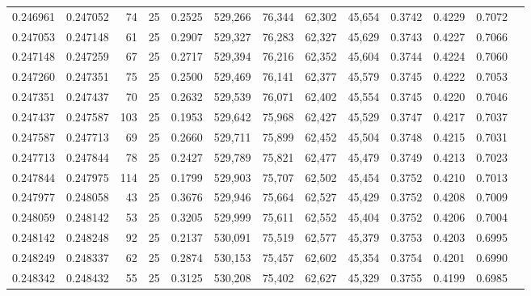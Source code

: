 \begin{tabular}{rrrrrrrrrrrrr}
0.246961 & 0.247052 &    74 &  25 &                                     0.2525 & 529,266 &  76,344 &  62,302 &  45,654 & 0.3742 & 0.4229 & 0.7072 \\
0.247053 & 0.247148 &    61 &  25 &                                     0.2907 & 529,327 &  76,283 &  62,327 &  45,629 & 0.3743 & 0.4227 & 0.7066 \\
0.247148 & 0.247259 &    67 &  25 &                                     0.2717 & 529,394 &  76,216 &  62,352 &  45,604 & 0.3744 & 0.4224 & 0.7060 \\
0.247260 & 0.247351 &    75 &  25 &                                     0.2500 & 529,469 &  76,141 &  62,377 &  45,579 & 0.3745 & 0.4222 & 0.7053 \\
0.247351 & 0.247437 &    70 &  25 &                                     0.2632 & 529,539 &  76,071 &  62,402 &  45,554 & 0.3745 & 0.4220 & 0.7046 \\
0.247437 & 0.247587 &   103 &  25 &                                     0.1953 & 529,642 &  75,968 &  62,427 &  45,529 & 0.3747 & 0.4217 & 0.7037 \\
0.247587 & 0.247713 &    69 &  25 &                                     0.2660 & 529,711 &  75,899 &  62,452 &  45,504 & 0.3748 & 0.4215 & 0.7031 \\
0.247713 & 0.247844 &    78 &  25 &                                     0.2427 & 529,789 &  75,821 &  62,477 &  45,479 & 0.3749 & 0.4213 & 0.7023 \\
0.247844 & 0.247975 &   114 &  25 &                                     0.1799 & 529,903 &  75,707 &  62,502 &  45,454 & 0.3752 & 0.4210 & 0.7013 \\
0.247977 & 0.248058 &    43 &  25 &                                     0.3676 & 529,946 &  75,664 &  62,527 &  45,429 & 0.3752 & 0.4208 & 0.7009 \\
0.248059 & 0.248142 &    53 &  25 &                                     0.3205 & 529,999 &  75,611 &  62,552 &  45,404 & 0.3752 & 0.4206 & 0.7004 \\
0.248142 & 0.248248 &    92 &  25 &                                     0.2137 & 530,091 &  75,519 &  62,577 &  45,379 & 0.3753 & 0.4203 & 0.6995 \\
0.248249 & 0.248337 &    62 &  25 &                                     0.2874 & 530,153 &  75,457 &  62,602 &  45,354 & 0.3754 & 0.4201 & 0.6990 \\
0.248342 & 0.248432 &    55 &  25 &                                     0.3125 & 530,208 &  75,402 &  62,627 &  45,329 & 0.3755 & 0.4199 & 0.6985 \\

\end{tabular}
